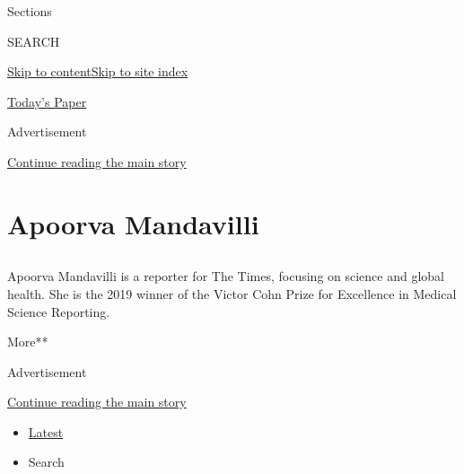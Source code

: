 Sections

SEARCH

\protect\hyperlink{site-content}{Skip to
content}\protect\hyperlink{site-index}{Skip to site index}

\href{https://myaccount.nytimes.com/auth/login?response_type=cookie\&client_id=vi}{}

\href{https://www.nytimes.com/section/todayspaper}{Today's Paper}

Advertisement

\protect\hyperlink{after-top}{Continue reading the main story}

\hypertarget{apoorva-mandavilli}{%
\section{Apoorva Mandavilli}\label{apoorva-mandavilli}}

\subsection{}

Apoorva Mandavilli is a reporter for The Times, focusing on science and
global health. She is the 2019 winner of the Victor Cohn Prize for
Excellence in Medical Science Reporting.

More**

Advertisement

\protect\hyperlink{after-mid1}{Continue reading the main story}

\begin{itemize}
\tightlist
\item
  \protect\hyperlink{stream-panel}{Latest}
\item
  Search
\end{itemize}

